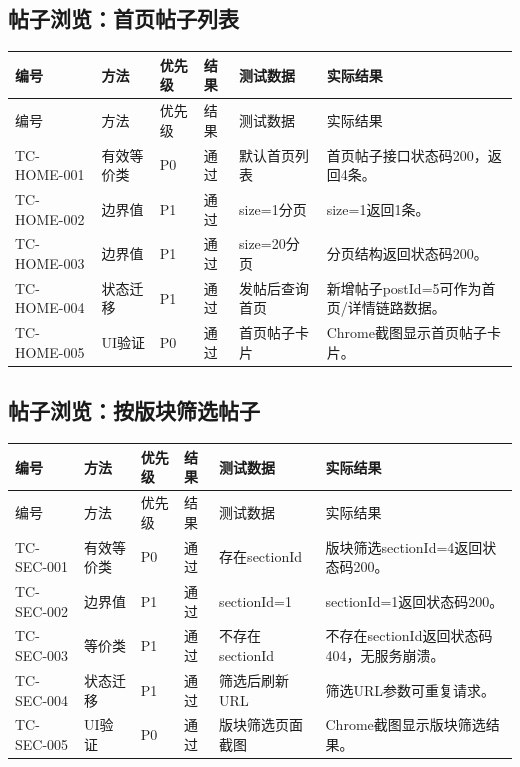 \documentclass[bwprint]{report}
\begin{document}
\subsection{帖子浏览：首页帖子列表}
{\footnotesize
\setlength{\tabcolsep}{3pt}
\begin{longtable}{P{2.0cm}P{2.0cm}P{0.9cm}P{0.9cm}P{3.4cm}P{5.4cm}}
\toprule
编号 & 方法 & 优先级 & 结果 & 测试数据 & 实际结果\\
\midrule
\endfirsthead
\toprule
编号 & 方法 & 优先级 & 结果 & 测试数据 & 实际结果\\
\midrule
\endhead
TC-HOME-001 & 有效等价类 & P0 & 通过 & 默认首页列表 & 首页帖子接口状态码200，返回4条。 \\
TC-HOME-002 & 边界值 & P1 & 通过 & size=1分页 & size=1返回1条。 \\
TC-HOME-003 & 边界值 & P1 & 通过 & size=20分页 & 分页结构返回状态码200。 \\
TC-HOME-004 & 状态迁移 & P1 & 通过 & 发帖后查询首页 & 新增帖子postId=5可作为首页/详情链路数据。 \\
TC-HOME-005 & UI验证 & P0 & 通过 & 首页帖子卡片 & Chrome截图显示首页帖子卡片。 \\
\bottomrule
\end{longtable}
}
\subsection{帖子浏览：按版块筛选帖子}
{\footnotesize
\setlength{\tabcolsep}{3pt}
\begin{longtable}{P{2.0cm}P{2.0cm}P{0.9cm}P{0.9cm}P{3.4cm}P{5.4cm}}
\toprule
编号 & 方法 & 优先级 & 结果 & 测试数据 & 实际结果\\
\midrule
\endfirsthead
\toprule
编号 & 方法 & 优先级 & 结果 & 测试数据 & 实际结果\\
\midrule
\endhead
TC-SEC-001 & 有效等价类 & P0 & 通过 & 存在sectionId & 版块筛选sectionId=4返回状态码200。 \\
TC-SEC-002 & 边界值 & P1 & 通过 & sectionId=1 & sectionId=1返回状态码200。 \\
TC-SEC-003 & 等价类 & P1 & 通过 & 不存在sectionId & 不存在sectionId返回状态码404，无服务崩溃。 \\
TC-SEC-004 & 状态迁移 & P1 & 通过 & 筛选后刷新URL & 筛选URL参数可重复请求。 \\
TC-SEC-005 & UI验证 & P0 & 通过 & 版块筛选页面截图 & Chrome截图显示版块筛选结果。 \\
\bottomrule
\end{longtable}
}
\end{document}
